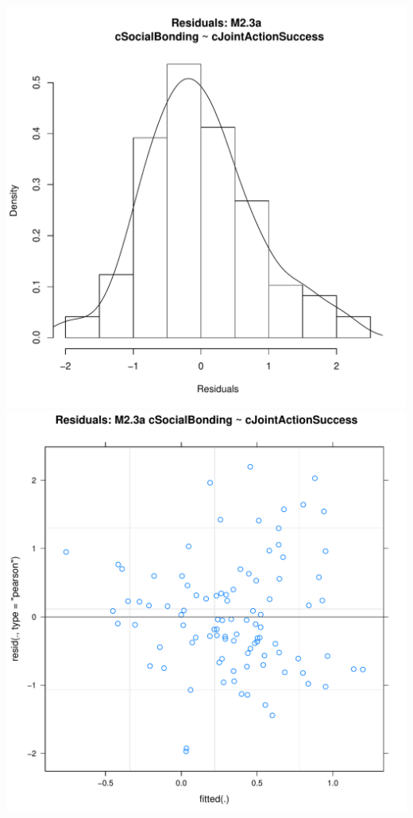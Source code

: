 \documentclass[12pt]{report}
\begin{document}
\newpage
\centering


\newpage
\centering
\includegraphics[scale =.4]{../images/MLM23aHist.pdf}
\includegraphics[scale =.4]{../images/MLM23aScatter.pdf}
\end{document}
